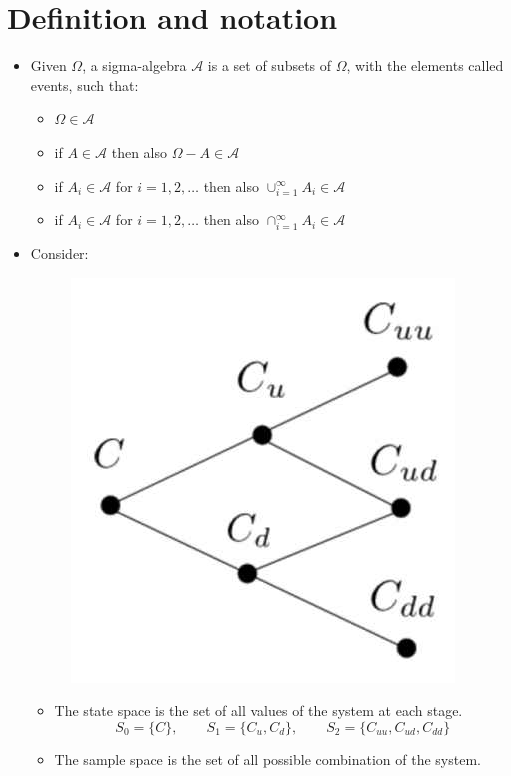 \documentclass[12pt, openany]{report}
\newcommand{\A}{\mathcal{A}}
\theoremstyle{definition}
\begin{document}
\chapter{Definition and notation}
\begin{itemize}
	\item Given $\Omega$, a sigma-algebra $\A$ is a set of subsets of $\Omega$, with the elements called events, such that:
	\begin{itemize}
		\item $\Omega \in \A$
		\item if $A \in \A$ then also $\Omega - A \in \A$
		\item if $A_i \in \A$ for $i = 1,2, \dots$ then also $\cup_{i=1}^\infty A_i \in \A$
		\item if $A_i \in \A$ for $i = 1,2, \dots$ then also $\cap_{i=1}^\infty A_i \in \A$
	\end{itemize}
	\item Consider: 
	\begin{figure}[H]
		\centering
		\includegraphics[scale=0.25]{img/space.jpg} 
	\end{figure}
	\begin{itemize}
		\item The state space is the set of all values of the system at each stage. 
		\begin{equation}
			S_0 = \{C\},\qquad S_1 = \{C_u, C_d\},\qquad S_2 = \{C_{uu}, C_{ud}, C_{dd}\}
		\end{equation}
		\item  The sample space is the set of all possible combination of the system.

\end{itemize}
\end{itemize}
\end{document}

